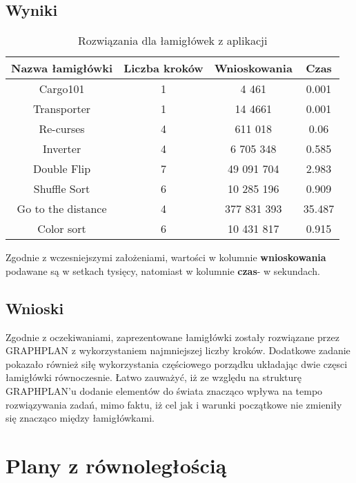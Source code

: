     \subsection{Wyniki}
    \begin{table}[H]
        \centering
         \begin{tabular}{||c | c | c| c |} 
         \hline
         Nazwa łamigłówki & Liczba kroków & Wnioskowania & Czas \\ [0.5ex] 
         \hline\hline
         Cargo101 & 1 & 4 461 & 0.001 \\ 
         \hline
         Transporter & 1 & 14 4661 & 0.001 \\
         \hline
         Re-curses & 4 & 611 018 & 0.06 \\
         \hline
         Inverter & 4 & 6 705 348 & 0.585 \\
         \hline
         Double Flip & 7 & 49 091 704 & 2.983 \\
         \hline
         Shuffle Sort & 6 & 10 285 196 & 0.909 \\ 
         \hline
         Go to the distance & 4 & 377 831 393 & 35.487 \\
         \hline
         Color sort & 6 & 10 431 817 & 0.915 \\ [1ex]
         \hline
         \end{tabular}
         \caption{Rozwiązania dla łamigłówek z aplikacji}
    \end{table}
    Zgodnie z wczesniejszymi założeniami, wartości w kolumnie \textbf{wnioskowania} podawane są w setkach tysięcy, natomiast 
    w kolumnie \textbf{czas}- w sekundach.



    \subsection{Wnioski}
    Zgodnie z oczekiwaniami, zaprezentowane łamigłówki zostały rozwiązane przez GRAPHPLAN z wykorzystaniem najmniejszej liczby kroków. 
    Dodatkowe zadanie pokazało również siłę wykorzystania częściowego porządku układając dwie częsci łamigłówki równoczesnie. Łatwo zauważyć,
    iż ze względu na strukturę GRAPHPLAN'u dodanie elementów do świata znacząco wpływa na tempo rozwiązywania zadań, mimo faktu, iż cel jak i warunki 
    początkowe nie zmieniły się znacząco między łamigłówkami. 
\section{Plany z równoległością}
